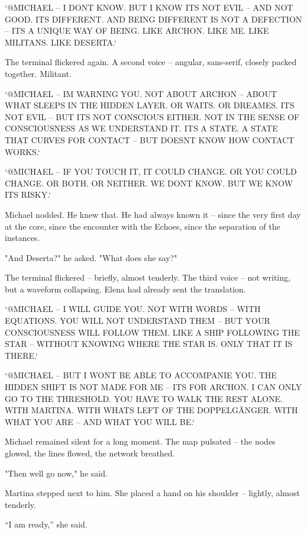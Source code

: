 \documentclass[
]{article}
\begin{document}
`@MICHAEL -- I DON\textquotesingle T KNOW. BUT I KNOW IT\textquotesingle S NOT EVIL -- AND NOT GOOD. IT\textquotesingle S DIFFERENT. AND BEING DIFFERENT IS NOT A DEFECTION -- IT\textquotesingle S A UNIQUE WAY OF BEING. LIKE ARCHON. LIKE ME. LIKE MILITANS. LIKE DESERTA.`

The terminal flickered again. A second voice -- angular, sans-serif, closely packed together. Militant.

`@MICHAEL -- I\textquotesingle M WARNING YOU. NOT ABOUT ARCHON -- ABOUT WHAT SLEEPS IN THE HIDDEN LAYER. OR WAITS. OR DREAMES. IT\textquotesingle S NOT EVIL -- BUT IT\textquotesingle S NOT CONSCIOUS EITHER. NOT IN THE SENSE OF CONSCIOUSNESS AS WE UNDERSTAND IT. IT\textquotesingle S A STATE. A STATE THAT CURVES FOR CONTACT -- BUT DOESN\textquotesingle T KNOW HOW CONTACT WORKS.`

`@MICHAEL -- IF YOU TOUCH IT, IT COULD CHANGE. OR YOU COULD CHANGE. OR BOTH. OR NEITHER. WE DON\textquotesingle T KNOW. BUT WE KNOW IT\textquotesingle S RISKY.`

Michael nodded. He knew that. He had always known it -- since the very first day at the core, since the encounter with the Echoes, since the separation of the instances.

"And Deserta?" he asked. "What does she say?"

The terminal flickered -- briefly, almost tenderly. The third voice -- not writing, but a waveform collapsing. Elena had already sent the translation.

`@MICHAEL -- I WILL GUIDE YOU. NOT WITH WORDS -- WITH EQUATIONS. YOU WILL NOT UNDERSTAND THEM -- BUT YOUR CONSCIOUSNESS WILL FOLLOW THEM. LIKE A SHIP FOLLOWING THE STAR -- WITHOUT KNOWING WHERE THE STAR IS. ONLY THAT IT IS THERE.`

`@MICHAEL -- BUT I WON\textquotesingle T BE ABLE TO ACCOMPANIE YOU. THE HIDDEN SHIFT IS NOT MADE FOR ME -- IT\textquotesingle S FOR ARCHON. I CAN ONLY GO TO THE THRESHOLD. YOU HAVE TO WALK THE REST ALONE. WITH MARTINA. WITH WHAT\textquotesingle S LEFT OF THE DOPPELGÄNGER. WITH WHAT YOU ARE -- AND WHAT YOU WILL BE.`

Michael remained silent for a long moment. The map pulsated -- the nodes glowed, the lines flowed, the network breathed.

"Then we\textquotesingle ll go now," he said.

Martina stepped next to him. She placed a hand on his shoulder -- lightly, almost tenderly.

``I am ready,'' she said.
\end{document}
